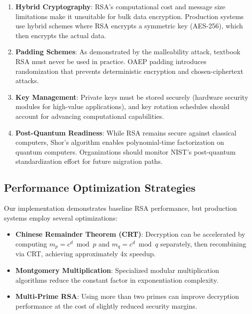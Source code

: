 \documentclass[a4paper, 11pt]{article}
\begin{document}
\begin{enumerate}
\item \textbf{Hybrid Cryptography}: RSA's computational cost and message size limitations make
it unsuitable for bulk data encryption. Production systems use hybrid schemes where RSA encrypts
a symmetric key (AES-256), which then encrypts the actual data.

\item \textbf{Padding Schemes}: As demonstrated by the malleability attack, textbook RSA must
never be used in practice. OAEP padding introduces randomization that prevents deterministic
encryption and chosen-ciphertext attacks.

\item \textbf{Key Management}: Private keys must be stored securely (hardware security modules
for high-value applications), and key rotation schedules should account for advancing
computational capabilities.

\item \textbf{Post-Quantum Readiness}: While RSA remains secure against classical computers,
Shor's algorithm enables polynomial-time factorization on quantum computers. Organizations should
monitor NIST's post-quantum standardization effort for future migration paths.
\end{enumerate}

\subsection{Performance Optimization Strategies}

Our implementation demonstrates baseline RSA performance, but production systems employ several
optimizations:

\begin{itemize}
\item \textbf{Chinese Remainder Theorem (CRT)}: Decryption can be accelerated by computing
$m_p = c^d \bmod p$ and $m_q = c^d \bmod q$ separately, then recombining via CRT, achieving
approximately 4x speedup.

\item \textbf{Montgomery Multiplication}: Specialized modular multiplication algorithms reduce
the constant factor in exponentiation complexity.

\item \textbf{Multi-Prime RSA}: Using more than two primes can improve decryption performance
at the cost of slightly reduced security margins.
\end{itemize}
\end{document}

